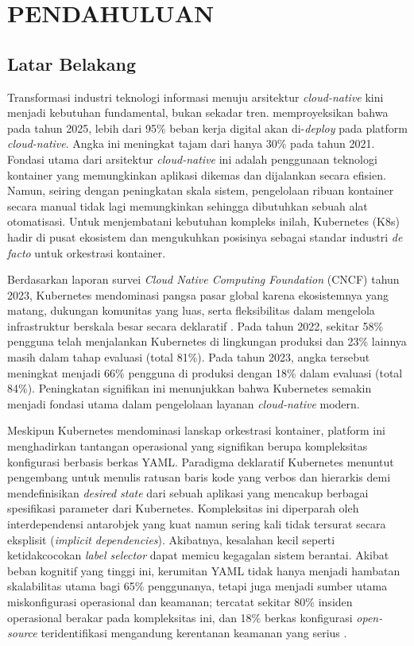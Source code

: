 ﻿\cleardoublepage %

\chapter{PENDAHULUAN}
\label{chap:pendahuluan}
\section{Latar Belakang}
Transformasi industri teknologi informasi menuju arsitektur \textit{cloud-native} kini menjadi kebutuhan fundamental, bukan sekadar tren. \textcite{gartner_cloud_2021} memproyeksikan bahwa pada tahun 2025, lebih dari 95\% beban kerja digital akan di-\textit{deploy} pada platform \textit{cloud-native}. Angka ini meningkat tajam dari hanya 30\% pada tahun 2021. Fondasi utama dari arsitektur \textit{cloud-native} ini adalah penggunaan teknologi kontainer yang memungkinkan aplikasi dikemas dan dijalankan secara efisien. Namun, seiring dengan peningkatan skala sistem, pengelolaan ribuan kontainer secara manual tidak lagi memungkinkan sehingga dibutuhkan sebuah alat otomatisasi. Untuk menjembatani kebutuhan kompleks inilah, Kubernetes (K8s) hadir di pusat ekosistem dan mengukuhkan posisinya sebagai standar industri \textit{de facto} untuk orkestrasi kontainer.

Berdasarkan laporan survei \textit{Cloud Native Computing Foundation} (CNCF) tahun 2023, Kubernetes mendominasi pangsa pasar global karena ekosistemnya yang matang, dukungan komunitas yang luas, serta fleksibilitas dalam mengelola infrastruktur berskala besar secara deklaratif \parencite{cncf_2023_survey}. Pada tahun 2022, sekitar 58\% pengguna telah menjalankan Kubernetes di lingkungan produksi dan 23\% lainnya masih dalam tahap evaluasi (total 81\%). Pada tahun 2023, angka tersebut meningkat menjadi 66\% pengguna di produksi dengan 18\% dalam evaluasi (total 84\%). Peningkatan signifikan ini menunjukkan bahwa Kubernetes semakin menjadi fondasi utama dalam pengelolaan layanan \textit{cloud-native} modern.

Meskipun Kubernetes mendominasi lanskap orkestrasi kontainer, platform ini menghadirkan tantangan operasional yang signifikan berupa kompleksitas konfigurasi berbasis berkas YAML. Paradigma deklaratif Kubernetes menuntut pengembang untuk menulis ratusan baris kode yang verbos dan hierarkis demi mendefinisikan \textit{desired state} dari sebuah aplikasi yang mencakup berbagai spesifikasi parameter dari Kubernetes. Kompleksitas ini diperparah oleh interdependensi antarobjek yang kuat namun sering kali tidak tersurat secara eksplisit (\textit{implicit dependencies}). Akibatnya, kesalahan kecil seperti ketidakcocokan \textit{label selector} dapat memicu kegagalan sistem berantai. Akibat beban kognitif yang tinggi ini, kerumitan YAML tidak hanya menjadi hambatan skalabilitas utama bagi 65\% penggunanya, tetapi juga menjadi sumber utama miskonfigurasi operasional dan keamanan; tercatat sekitar 80\% insiden operasional berakar pada kompleksitas ini, dan 18\% berkas konfigurasi \textit{open-source} teridentifikasi mengandung kerentanan keamanan yang serius \parencite{rahman2023misconfigurations}.

